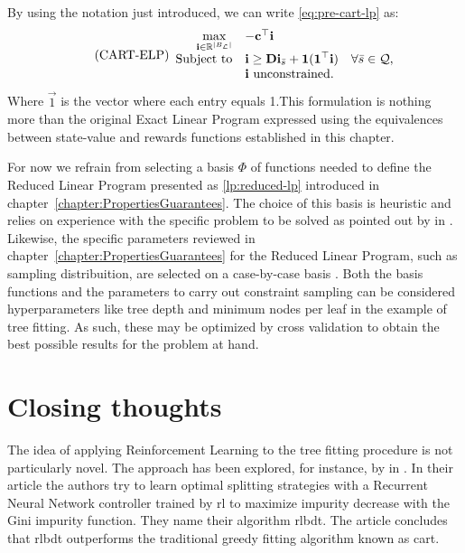 By using the notation just introduced, we can write \eqref{eq:pre-cart-lp} as:
\begin{equation}
\tag{CART-ELP}
\label{lp:cart-elp}
\begin{array}{rl@{}ll}
    \displaystyle \max_{\vec{i} \in \R^{|B_\L|}} & - \vec{c}^{\top} \vec{i} \\
    \text{Subject to} & \displaystyle \vec{i} \geq \vec{Di}_{\bar{s}} + \vec{1} (\vec{1}^{\top} \vec{i}) & \quad \forall \bar{s} \in \mathcal{Q}, \\
    & \vec{i} \text{ unconstrained.} &
\end{array}
\end{equation}
Where $\vec{1}$ is the vector where each entry equals 1.This formulation is
nothing more than the original Exact Linear Program expressed using the
equivalences between state-value and rewards functions established in this
chapter.

For now we refrain from selecting a basis $\Phi$ of functions needed to define
the Reduced Linear Program presented as \ref{lp:reduced-lp} introduced in
chapter~\ref{chapter:PropertiesGuarantees}. The choice of this basis is
heuristic and relies on experience with the specific problem to be solved as
pointed out by \citeauthor{farias2003LP2ADP} in \cite{farias2003LP2ADP}.
Likewise, the specific parameters reviewed in
chapter~\ref{chapter:PropertiesGuarantees} for the Reduced Linear Program, such
as sampling distribuition, are selected on a case-by-case basis
\cite{farias2004constraint}. Both the basis functions and the parameters to
carry out constraint sampling can be considered hyperparameters like tree depth
and minimum nodes per leaf in the example of tree fitting. As such, these may be
optimized by cross validation \cite[Ch.~2.1]{intro2statslearning} to obtain the
best possible results for the problem at hand.  

\section{Closing thoughts}

The idea of applying Reinforcement Learning to the tree fitting procedure is not
particularly novel. The approach has been explored, for instance, by
\citeauthor{xiong} in \cite{xiong}. In their article the authors try to learn
optimal splitting strategies with a Recurrent Neural Network controller trained
by \ac{rl} to maximize impurity decrease with the Gini impurity function. They
name their algorithm \ac{rlbdt}. The article concludes that \ac{rlbdt}
outperforms the traditional greedy fitting algorithm known as \ac{cart}.

